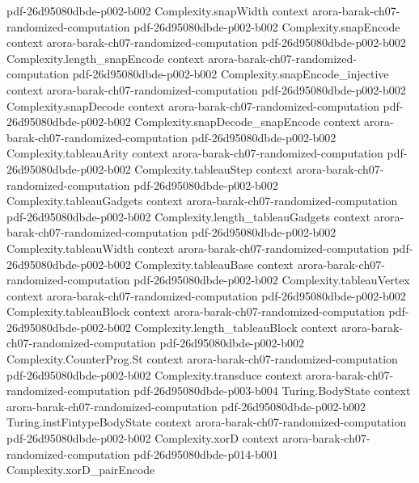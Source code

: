 \begin{theorem}
  {pdf-26d95080dbde-p002-b002}
\proofstep
  {Complexity.snapWidth}
  {context}
  {arora-barak-ch07-randomized-computation}
  {pdf-26d95080dbde-p002-b002}
\proofstep
  {Complexity.snapEncode}
  {context}
  {arora-barak-ch07-randomized-computation}
  {pdf-26d95080dbde-p002-b002}
\proofstep
  {Complexity.length_snapEncode}
  {context}
  {arora-barak-ch07-randomized-computation}
  {pdf-26d95080dbde-p002-b002}
\proofstep
  {Complexity.snapEncode_injective}
  {context}
  {arora-barak-ch07-randomized-computation}
  {pdf-26d95080dbde-p002-b002}
\proofstep
  {Complexity.snapDecode}
  {context}
  {arora-barak-ch07-randomized-computation}
  {pdf-26d95080dbde-p002-b002}
\proofstep
  {Complexity.snapDecode_snapEncode}
  {context}
  {arora-barak-ch07-randomized-computation}
  {pdf-26d95080dbde-p002-b002}
\proofstep
  {Complexity.tableauArity}
  {context}
  {arora-barak-ch07-randomized-computation}
  {pdf-26d95080dbde-p002-b002}
\proofstep
  {Complexity.tableauStep}
  {context}
  {arora-barak-ch07-randomized-computation}
  {pdf-26d95080dbde-p002-b002}
\proofstep
  {Complexity.tableauGadgets}
  {context}
  {arora-barak-ch07-randomized-computation}
  {pdf-26d95080dbde-p002-b002}
\proofstep
  {Complexity.length_tableauGadgets}
  {context}
  {arora-barak-ch07-randomized-computation}
  {pdf-26d95080dbde-p002-b002}
\proofstep
  {Complexity.tableauWidth}
  {context}
  {arora-barak-ch07-randomized-computation}
  {pdf-26d95080dbde-p002-b002}
\proofstep
  {Complexity.tableauBase}
  {context}
  {arora-barak-ch07-randomized-computation}
  {pdf-26d95080dbde-p002-b002}
\proofstep
  {Complexity.tableauVertex}
  {context}
  {arora-barak-ch07-randomized-computation}
  {pdf-26d95080dbde-p002-b002}
\proofstep
  {Complexity.tableauBlock}
  {context}
  {arora-barak-ch07-randomized-computation}
  {pdf-26d95080dbde-p002-b002}
\proofstep
  {Complexity.length_tableauBlock}
  {context}
  {arora-barak-ch07-randomized-computation}
  {pdf-26d95080dbde-p002-b002}
\proofstep
  {Complexity.CounterProg.St}
  {context}
  {arora-barak-ch07-randomized-computation}
  {pdf-26d95080dbde-p002-b002}
\proofstep
  {Complexity.transduce}
  {context}
  {arora-barak-ch07-randomized-computation}
  {pdf-26d95080dbde-p003-b004}
\proofstep
  {Turing.BodyState}
  {context}
  {arora-barak-ch07-randomized-computation}
  {pdf-26d95080dbde-p002-b002}
\proofstep
  {Turing.instFintypeBodyState}
  {context}
  {arora-barak-ch07-randomized-computation}
  {pdf-26d95080dbde-p002-b002}
\proofstep
  {Complexity.xorD}
  {context}
  {arora-barak-ch07-randomized-computation}
  {pdf-26d95080dbde-p014-b001}
\proofstep
  {Complexity.xorD_pairEncode}

\end{theorem}
